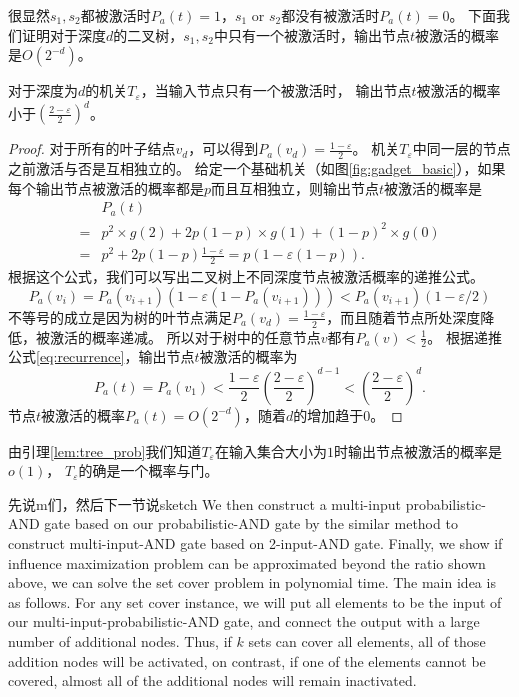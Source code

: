 很显然$s_1,s_2$都被激活时$P_a(t)=1$，$s_1$ or $s_2$都没有被激活时$P_a(t)=0$。
下面我们证明对于深度$d$的二叉树，$s_1,s_2$中只有一个被激活时，输出节点$t$被激活的概率是$O(2^{-d})$。
\begin{lemma}
\label{lem:tree_prob}
对于深度为$d$的机关$T_\varepsilon$，当输入节点只有一个被激活时，
输出节点$t$被激活的概率小于$(\frac{2-\varepsilon}{2})^{d}$。
\end{lemma}
\begin{proof}
对于所有的叶子结点$v_d$，可以得到$P_a(v_d) = \frac{1-\varepsilon}{2}$。
机关$T_\varepsilon$中同一层的节点之前激活与否是互相独立的。
给定一个基础机关（如图\ref{fig:gadget_basic}），如果每个输出节点被激活的概率都是$p$而且互相独立，则输出节点$t$被激活的概率是
\begin{equation*}
\begin{array}{ll}
& P_a(t) \\
= & p^2\times g(2) + 2p(1-p)\times g(1) + (1-p)^2\times g(0) \\
= & p^2 + 2p(1-p)\frac{1-\varepsilon}{2} = p(1-\varepsilon(1-p)).
\end{array}
\end{equation*}
根据这个公式，我们可以写出二叉树上不同深度节点被激活概率的递推公式。
\begin{equation}
\label{eq:recurrence}
P_a(v_i) = P_a(v_{i+1})(1-\varepsilon(1-P_a(v_{i+1}))) <  P_a(v_{i+1})(1-\varepsilon/2)
\end{equation}
不等号的成立是因为树的叶节点满足$P_a(v_d) = \frac{1-\varepsilon}{2}$，而且随着节点所处深度降低，被激活的概率递减。
所以对于树中的任意节点$v$都有$P_a(v) < \frac{1}{2}$。
根据递推公式\ref{eq:recurrence}，输出节点$t$被激活的概率为
\begin{equation*}
\label{eq:p_a_t}
 P_a(t) 
=  P_a(v_1) 
<  \frac{1-\varepsilon}{2}(\frac{2-\varepsilon}{2})^{d-1} 
<  (\frac{2-\varepsilon}{2})^{d}.
\end{equation*}
节点$t$被激活的概率$P_a(t) = O(2^{-d})$，随着$d$的增加趋于$0$。
\end{proof}
由引理\ref{lem:tree_prob}我们知道$T_\varepsilon$在输入集合大小为$1$时输出节点被激活的概率是$o(1)$，
$T_\varepsilon$的确是一个概率与门。

先说m们，然后下一节说sketch
We then construct a multi-input probabilistic-AND gate based on our probabilistic-AND gate by the similar method to construct multi-input-AND gate based on 2-input-AND gate. Finally, we show if influence maximization problem can be approximated beyond the ratio shown above, we can solve the set cover problem in polynomial time. The main idea is as follows. For any set cover instance, we will put all elements to be the input of our multi-input-probabilistic-AND gate, and connect the output with a large number of additional nodes. Thus, if $k$ sets can cover all elements, all of those addition nodes will be activated, on contrast, if one of the elements cannot be covered, almost all of the additional nodes will remain inactivated.

